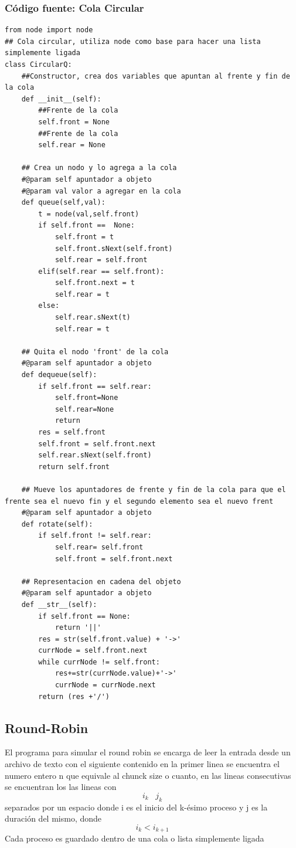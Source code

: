 \documentclass[12pt]{article}
\begin{document}
\subsubsection{Código fuente: Cola Circular}
\begin{verbatim}
from node import node
## Cola circular, utiliza node como base para hacer una lista simplemente ligada
class CircularQ:
    ##Constructor, crea dos variables que apuntan al frente y fin de la cola
    def __init__(self):
        ##Frente de la cola
        self.front = None
        ##Frente de la cola
        self.rear = None

    ## Crea un nodo y lo agrega a la cola
    #@param self apuntador a objeto
    #@param val valor a agregar en la cola
    def queue(self,val):
        t = node(val,self.front)
        if self.front ==  None:
            self.front = t
            self.front.sNext(self.front)
            self.rear = self.front
        elif(self.rear == self.front):
            self.front.next = t
            self.rear = t
        else:
            self.rear.sNext(t)
            self.rear = t

    ## Quita el nodo 'front' de la cola
    #@param self apuntador a objeto
    def dequeue(self):
        if self.front == self.rear:
            self.front=None
            self.rear=None
            return
        res = self.front
        self.front = self.front.next
        self.rear.sNext(self.front)
        return self.front

    ## Mueve los apuntadores de frente y fin de la cola para que el frente sea el nuevo fin y el segundo elemento sea el nuevo frent
    #@param self apuntador a objeto
    def rotate(self):
        if self.front != self.rear:
            self.rear= self.front
            self.front = self.front.next

    ## Representacion en cadena del objeto
    #@param self apuntador a objeto
    def __str__(self):
        if self.front == None:
            return '||'
        res = str(self.front.value) + '->'
        currNode = self.front.next
        while currNode != self.front:
            res+=str(currNode.value)+'->'
            currNode = currNode.next
        return (res +'/')

\end{verbatim}
\subsection{Round-Robin}
El programa para simular el round robin se encarga de leer la entrada desde un archivo de texto con el siguiente contenido
en la primer linea se encuentra el numero entero n que equivale al chunck size o cuanto, en las lineas consecutivas se encuentran los las lineas con \[i_k \;\;\;j_k\]separados por un espacio donde  i es el inicio del k-ésimo proceso y j es la duración del mismo, donde\[i_{k}<i_{k+1}\] 
Cada proceso es guardado dentro de una cola o lista simplemente ligada 
\end{document}
